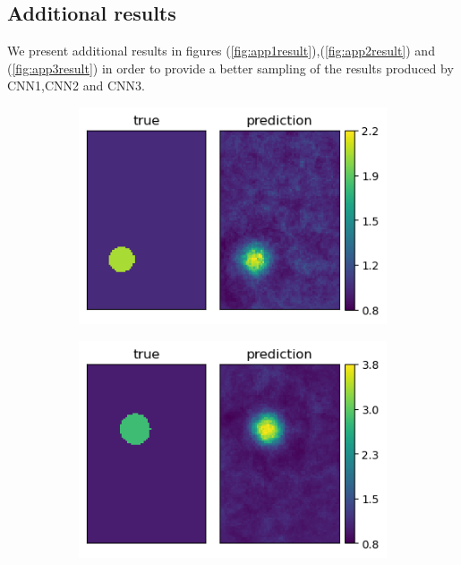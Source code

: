 \documentclass[12pt]{article}
\newcommand{\nhgappwidth}{0.23\linewidth}
\newcommand{\nhgappheight}{2.2cm}
\begin{document}
\begin{appendices}
\section{Additional results}
We present additional results in figures (\ref{fig:app1result}),(\ref{fig:app2result}) and (\ref{fig:app3result}) in order to provide a better sampling of the results produced by CNN1,CNN2 and CNN3.
\begin{figure}[!h]
  \centering
  \begin{subfigure}[c]{\nhgappwidth}
    \centering    
    \includegraphics[totalheight=\nhgappheight]{Figures/Appendix/CNN1/ex1/mu.png}
  \end{subfigure}
  \begin{subfigure}[c]{\nhgappwidth}
    \centering    
    \includegraphics[totalheight=\nhgappheight]{Figures/Appendix/CNN1/ex2/mu.png}

\end{subfigure}
\end{figure}
\end{appendices}
\end{document}
